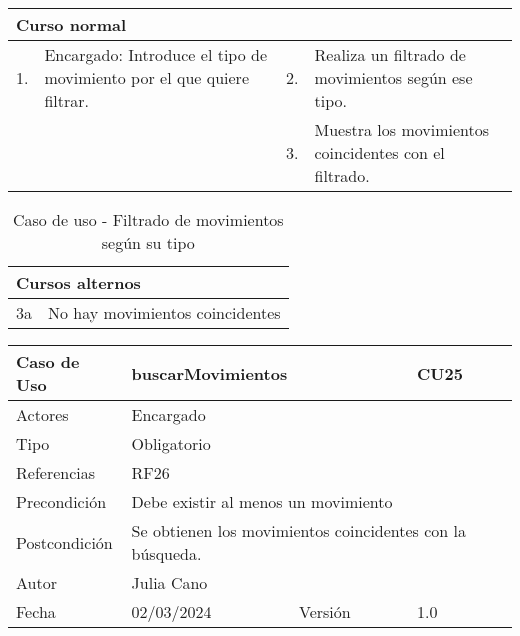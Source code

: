 \begin{table}[H]
	\centering
	\begin{tabular}{| m{} | m{} | m{} | m{} |}
		\hline
		\multicolumn{4}{|m{0.9\textwidth}|}{Curso normal}     \\ 
		\hline
		1. & Encargado: Introduce el tipo de movimiento por el que quiere filtrar. & 2. &  Realiza un filtrado de movimientos según ese tipo.  \\ 
		\hline
		&  & 3. &  Muestra los movimientos coincidentes con el filtrado.  \\ 
		\hline
	\end{tabular}
\end{table}

\begin{table}[H]
	\centering
	\begin{tabular}{| m{} | m{} | m{} | m{} |}
		\hline
		\multicolumn{4}{|m{0.9\textwidth}|}{Cursos alternos}     \\ 
		\hline
		3a & \multicolumn{3}{m{0.67\textwidth}|}{No hay movimientos coincidentes} \\ 
		\hline
	\end{tabular}
	\caption{Caso de uso - Filtrado de movimientos según su tipo}
\end{table}

\newpage


\begin{table}[H]
	\centering
	\begin{tabular}{| m{} | m{} | m{} | m{}|}
		\hline
		\rowcolor{grayshade} Caso de Uso & \multicolumn{2}{|m{0.43\textwidth}|}{buscarMovimientos} &  CU25\\ 
		\hline
		Actores & \multicolumn{3}{l|}{Encargado} \\ 
		\hline
		Tipo & \multicolumn{3}{l|}{Obligatorio} \\ 
		\hline
		Referencias & \multicolumn{3}{l|}{RF26} \\ 
		\hline
		Precondición & \multicolumn{3}{m{0.67\textwidth}|}{Debe existir al menos un movimiento} \\ 
		\hline
		Postcondición & \multicolumn{3}{m{0.67\textwidth}|}{Se obtienen los movimientos coincidentes con la búsqueda.} \\ 
		\hline
		Autor & \multicolumn{3}{l|}{Julia Cano} \\ 
		\hline
		Fecha & 02/03/2024 & Versión & 1.0 \\
		\hline
	\end{tabular}
\end{table}

